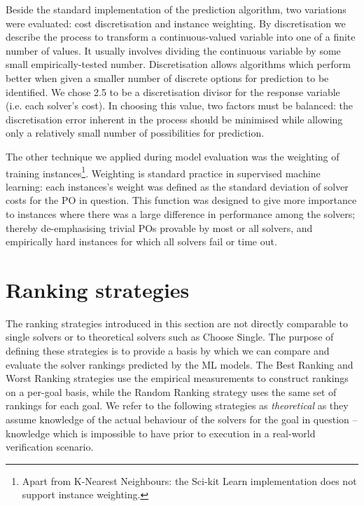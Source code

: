 Beside the standard implementation of the prediction algorithm, two variations were evaluated: cost discretisation and instance weighting.
By discretisation we describe the process to transform a continuous-valued variable into one of a finite number of values. 
It usually involves dividing the continuous variable by some small empirically-tested number. 
Discretisation allows algorithms which perform better when given a smaller number of discrete options for prediction to be identified. 
We chose 2.5 to be a discretisation divisor for the response variable (i.e. each solver's cost).
In choosing this value, two factors must be balanced: the discretisation error inherent in the process should be minimised while allowing only a relatively small number of possibilities for prediction.

The other technique we applied during model evaluation was the weighting of training instances\footnote{Apart from K-Nearest Neighbours: the Sci-kit Learn implementation does not support instance weighting.}.
Weighting is standard practice in supervised machine learning: each instances's weight was defined as the standard deviation of solver costs for the PO in question. 
This function was designed to give more importance to instances where there was a large difference in performance among the solvers; thereby de-emphasising trivial POs provable by most or all solvers, and empirically hard instances for which all solvers fail or time out.  


\section{Ranking strategies}
\label{sec:strategies}

The ranking strategies introduced in this section are not directly comparable to single solvers or to theoretical solvers such as \textsf{Choose Single}. 
The purpose of defining these strategies is to provide a basis by which we can compare and evaluate the solver rankings predicted by the ML models.
The \textsf{Best Ranking} and \textsf{Worst Ranking} strategies use the empirical measurements to construct rankings on a per-goal basis, while the \textsf{Random Ranking} strategy uses the same set of rankings for each goal.
We refer to the following strategies as \textit{theoretical} as they assume knowledge of the actual behaviour of the solvers for the goal in question -- knowledge which is impossible to have prior to execution in a real-world verification scenario.     

